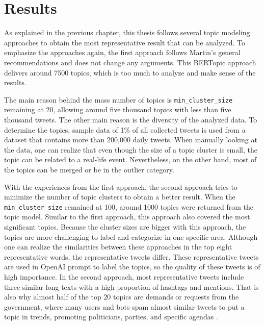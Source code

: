 
\chapter{Results}\label{chapter:results}

As explained in the previous chapter, this thesis follows several topic modeling approaches to 
obtain the most representative result that can be analyzed. To emphasize the approaches again, 
the first approach follows Martin's general recommendations and does not change any arguments. 
This BERTopic approach delivers around 7500 topics, which is too much to analyze and make sense 
of the results. 

The main reason behind the mass number of topics is \texttt{min\_cluster\_size} remaining at 20, 
allowing around five thousand topics with less than five thousand tweets. The other main reason 
is the diversity of the analyzed data. To determine the topics, sample data of 1\% of all collected 
tweets is used from a dataset that contains more than 200,000 daily tweets. 
When manually looking at the data, one can realize that even though the size of a topic cluster
is small, the topic can be related to a real-life event. Nevertheless, on the other hand, most of the 
topics can be merged or be in the outlier category.

With the experiences from the first approach, the second approach tries to minimize the 
number of topic clusters to obtain a better result. When the \texttt{min\_cluster\_size} remained 
at 100, around 1000 topics were returned from the topic model. Similar to the first approach, 
this approach also covered the most significant topics. Because the cluster sizes are bigger 
with this approach, the topics are more challenging to label and categorize in one specific area. Although 
one can realize the similarities between these approaches in the top eight representative words, 
the representative tweets differ. These representative tweets are used in OpenAI prompt to label 
the topics, so the quality of these tweets is of high importance. In the second approach, most 
representative tweets include three similar long texts with a high proportion of hashtags and 
mentions. That is also why almost half of the top 20 topics are demands or requests from the 
government, where many users and bots spam almost similar tweets to put a topic in trends, 
promoting politicians, parties, and specific agendas \parencite{secim2023}.

